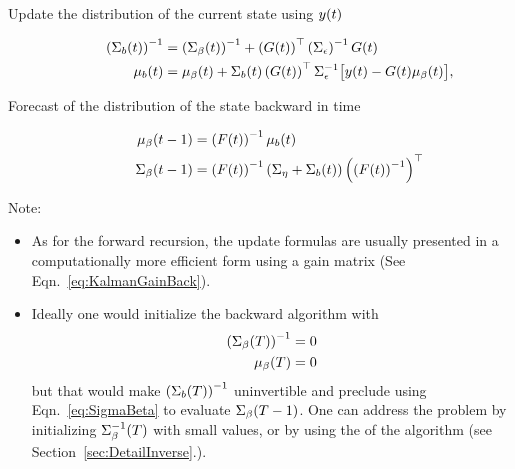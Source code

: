 \begin{description}
\item[Update the distribution of the current state using ${y}{(t)}$]
  \begin{subequations}
    \label{eq:BUpdate}
    \begin{align}
    \left({\Sigma_b}{(t)} \right)^{-1} &= \left({\Sigma_\beta}{(t)}
    \right)^{-1} + \left( {G}{(t)} \right)^\top
    \left(\Sigma_\epsilon
    \right)^{-1} {G}{(t)} \\
        {\mu_b}{(t)} &= {\mu_\beta}{(t)} + {\Sigma_{b}}{(t)}
        \left( {G}{(t)} \right)^\top \Sigma_\epsilon^{-1}
        \big[{y}{(t)} - {G}{(t)} {\mu_\beta}{(t)}\big],
  \end{align}
  \end{subequations}
\item[Forecast of the distribution of the state backward in time]
  \begin{subequations}
    \label{eq:BFore}
    \begin{align}
      {\mu_\beta}{(t-1)} &= \left( {F}{(t)} \right)^{-1}
      {\mu_b}{(t)} \\
      \label{eq:SigmaBeta}
      {\Sigma_\beta}{(t-1)} &= \left( {F}{(t)} \right)^{-1} \left(
        \Sigma_\eta + {\Sigma_b}{(t)} \right) \left( \left( {F}{(t)}
        \right)^{-1} \right)^\top
    \end{align}
  \end{subequations}
\end{description}
Note:
\begin{itemize}
\item As for the forward recursion, the update formulas are usually
  presented in a computationally more efficient form using a gain
  matrix (See Eqn.~\eqref{eq:KalmanGainBack}).
\item Ideally one would initialize the backward algorithm with
  \begin{align*}
    \left( {\Sigma_\beta}{(T)} \right)^{-1} &= 0\\
    {\mu_\beta}{(T)} &= 0
  \end{align*}
  but that would make $\left( {\Sigma_b}{(T)} \right)^{-1}$
  uninvertible and preclude using Eqn.~\eqref{eq:SigmaBeta} to
  evaluate ${\Sigma_\beta}{(T-1)}$.  One can address the problem by
  initializing ${\Sigma_\beta^{-1}}{(T)}$ with small values, or by using
  the \emph{} of the algorithm (see
  Section~\ref{sec:DetailInverse}.).
\end{itemize}

